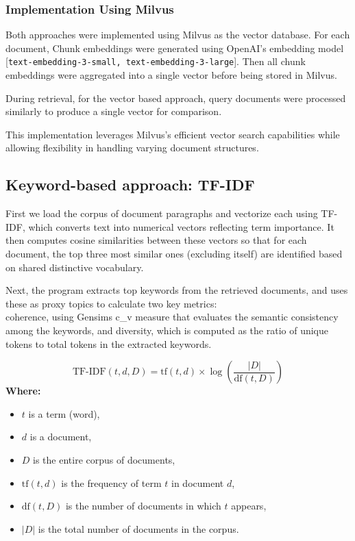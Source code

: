 \documentclass[12pt]{article}
\begin{document}
\subsubsection{Implementation Using Milvus}

Both approaches were implemented using Milvus as the vector database. For each document, Chunk embeddings were generated using OpenAI's embedding model [\texttt{text-embedding-3-small, text-embedding-3-large}]. Then all chunk embeddings were aggregated into a single vector before being stored in Milvus.

During retrieval, for the vector based approach, query documents were processed similarly to produce a single vector for comparison.

This implementation leverages Milvus's efficient vector search capabilities while allowing flexibility in handling varying document structures.

\subsection{Keyword-based approach: TF-IDF}

First we load the corpus of document paragraphs and vectorize each using TF-IDF, which converts text into numerical vectors reflecting term importance.
It then computes cosine similarities between these vectors so that for each document, the top three most similar ones (excluding itself) are identified based on shared distinctive vocabulary. 

Next, the program extracts top keywords from the retrieved documents, and uses these as proxy topics to calculate two key metrics: \\
coherence, using Gensims c\_v measure that evaluates the semantic consistency among the keywords, and diversity, which is computed as the ratio of unique tokens to total tokens in the extracted keywords.

\[
\text{TF-IDF}(t, d, D) = \text{tf}(t, d) \times \log\!\left(\frac{|D|}{\text{df}(t, D)}\right)
\]
\textbf{Where:}
\begin{itemize}
  \item $t$ is a term (word),
  \item $d$ is a document,
  \item $D$ is the entire corpus of documents,
  \item $\text{tf}(t,d)$ is the frequency of term $t$ in document $d$,
  \item $\text{df}(t,D)$ is the number of documents in which $t$ appears,
  \item $|D|$ is the total number of documents in the corpus.
\end{itemize}
\end{document}
